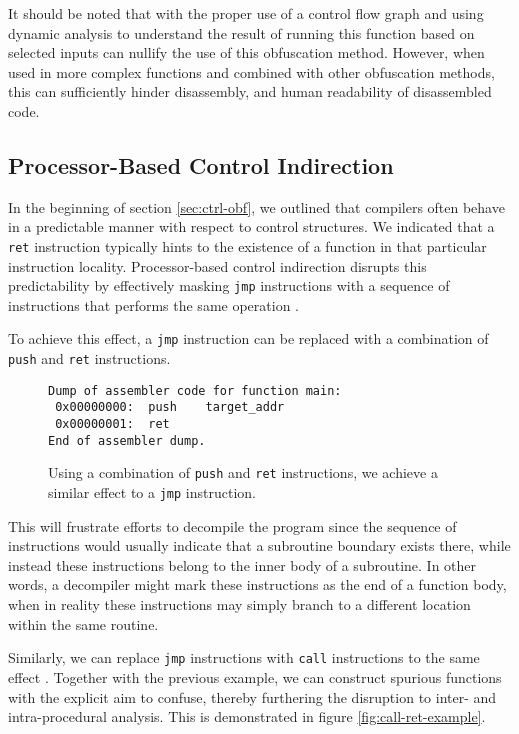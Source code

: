 \documentclass[conference]{IEEEtran}
\begin{document}
 It should be noted that with the proper use of a control flow graph and using dynamic analysis to understand the result of running this function based on selected inputs can nullify the use of this obfuscation method. However, when used in more complex functions and combined with other obfuscation methods, this can sufficiently hinder disassembly, and human readability of disassembled code.

\subsection{Processor-Based Control Indirection}
In the beginning of section \ref{sec:ctrl-obf}, we outlined that compilers often behave in a predictable manner with respect to control structures. We indicated that a \texttt{ret} instruction typically hints to the existence of a function in that particular instruction locality. Processor-based control indirection disrupts this predictability by effectively masking \texttt{jmp} instructions with a sequence of instructions that performs the same operation \cite{b7}.

To achieve this effect, a \texttt{jmp} instruction can be replaced with a combination of \texttt{push} and \texttt{ret} instructions.

\begin{figure}[h]
\begin{lstlisting}[basicstyle=\footnotesize]
Dump of assembler code for function main:
 0x00000000:  push    target_addr
 0x00000001:  ret
End of assembler dump.
\end{lstlisting}
\caption{Using a combination of \texttt{push} and \texttt{ret} instructions, we achieve a similar effect to a \texttt{jmp} instruction.}
\label{fig10}
\end{figure}

This will frustrate efforts to decompile the program since the sequence of instructions would usually indicate that a subroutine boundary exists there, while instead these instructions belong to the inner body of a subroutine. In other words, a decompiler might mark these instructions as the end of a function body, when in reality these instructions may simply branch to a different location within the same routine.

Similarly, we can replace \texttt{jmp} instructions with \texttt{call} instructions to the same effect \cite{b7}. Together with the previous example, we can construct spurious functions with the explicit aim to confuse, thereby furthering the disruption to inter- and intra-procedural analysis. This is demonstrated in figure \ref{fig:call-ret-example}.
\end{document}
